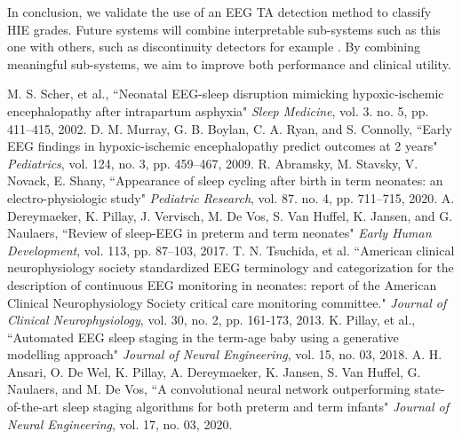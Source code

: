 \documentclass[conference]{IEEEtran}
\begin{document}

In conclusion, we validate the use of an EEG TA detection method to classify HIE grades. Future systems will combine interpretable sub-systems such as this one with others, such as discontinuity detectors for example \cite{R13}. 
By combining meaningful sub-systems, we aim to improve both performance and clinical utility.


\begin{thebibliography}{99}
 M. S. Scher, et al., ``Neonatal EEG-sleep disruption mimicking hypoxic-ischemic encephalopathy after intrapartum asphyxia" \textit{Sleep Medicine}, vol. 3. no. 5, pp. 411--415, 2002.
 D. M. Murray, G. B. Boylan, C. A. Ryan, and S. Connolly, ``Early EEG findings in hypoxic-ischemic encephalopathy predict outcomes at 2 years" \textit{Pediatrics}, vol. 124, no. 3, pp. 459--467, 2009.
 R. Abramsky, M. Stavsky, V. Novack, E. Shany, ``Appearance of sleep cycling after birth in term neonates: an electro-physiologic study" \textit{Pediatric Research}, vol. 87. no. 4, pp. 711--715, 2020.
 A. Dereymaeker, K. Pillay, J. Vervisch, M. De Vos, S. Van Huffel, K. Jansen, and G. Naulaers, ``Review of sleep-EEG in preterm and term neonates" \textit{Early Human Development}, vol. 113, pp. 87--103, 2017.
 T. N. Tsuchida, et al. ``American clinical neurophysiology society standardized EEG terminology and categorization for the description of continuous EEG monitoring in neonates: report of the American Clinical Neurophysiology Society critical care monitoring committee." \textit{Journal of Clinical Neurophysiology}, vol. 30, no. 2, pp. 161-173, 2013.
  K. Pillay, et al., ``Automated EEG sleep staging in the term-age baby using a generative modelling approach" \textit{Journal of Neural Engineering}, vol. 15, no. 03, 2018.
 A. H. Ansari, O. De Wel, K. Pillay, A. Dereymaeker, K. Jansen, S. Van Huffel, G. Naulaers, and M. De Vos, ``A convolutional neural network outperforming state-of-the-art sleep staging algorithms for both preterm and term infants" \textit{Journal of Neural Engineering}, vol. 17, no. 03, 2020.

\end{thebibliography}
\end{document}
